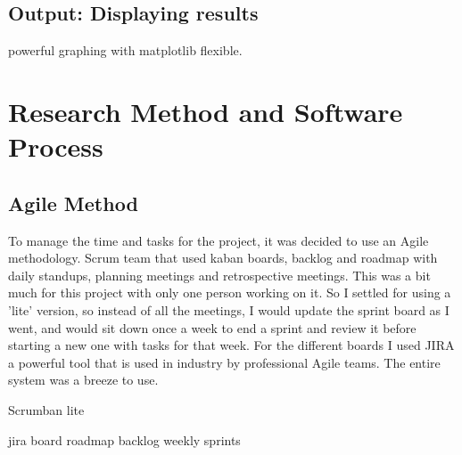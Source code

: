 \subsection{Output: Displaying results}

powerful graphing with matplotlib flexible.



\section{Research Method and Software Process}
\begin{comment}
You need to describe briefly the life cycle model or research method that you used. You do not need to write about all of the different process models that you are aware of. Focus on the process model or research method that you have used. It is possible that you needed to adapt an existing method to suit your project; clearly identify what you used and how you adapted it for your needs.

For the research-oriented projects, there needs to be a suitable process for the construction of the software elements that support your work.
\end{comment}


\subsection{Agile Method}
\begin{comment}
what is it?
why am i using it?
\end{comment}

To manage the time and tasks for the project, it was decided to use an Agile methodology. Scrum team that used kaban boards, backlog and roadmap with daily standups, planning meetings and retrospective meetings. This was a bit much for this project with only one person working on it. So I settled for using a 'lite' version, so instead of all the meetings, I would update the sprint board as I went, and would sit down once a week to end a sprint and review it before starting a new one with tasks for that week. For the different boards I used JIRA a powerful tool that is used in industry by professional Agile teams. The entire system was a breeze to use.

Scrumban lite

jira board
roadmap
backlog
weekly sprints



